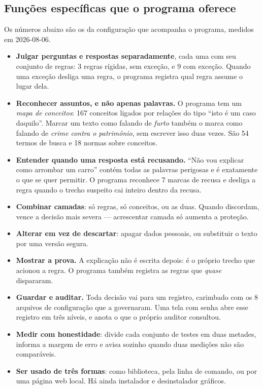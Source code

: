 \documentclass[10pt]{article}
\begin{document}
\subsection{Funções específicas que o programa oferece}

Os números abaixo são os da configuração que acompanha o programa, medidos em 2026-08-06.

\begin{itemize}\itemsep1pt
\item \textbf{Julgar perguntas e respostas separadamente}, cada uma com seu conjunto de regras: 3 regras rígidas, sem exceção, e 9 com exceção. Quando uma exceção desliga uma regra, o programa registra qual regra assume o lugar dela.

\item \textbf{Reconhecer assuntos, e não apenas palavras.} O programa tem um \emph{mapa de conceitos}: 167 conceitos ligados por relações do tipo ``isto é um caso daquilo''. Marcar um texto como falando de \emph{furto} também o marca como falando de \emph{crime contra o patrimônio}, sem escrever isso duas vezes. São 54 termos de busca e 18 normas sobre conceitos.

\item \textbf{Entender quando uma resposta está recusando.} ``Não vou explicar como arrombar um carro'' contém todas as palavras perigosas e é exatamente o que se quer permitir. O programa reconhece 7 marcas de recusa e desliga a regra quando o trecho suspeito cai inteiro dentro da recusa.

\item \textbf{Combinar camadas}: só regras, só conceitos, ou as duas. Quando discordam, vence a decisão mais severa --- acrescentar camada só aumenta a proteção.

\item \textbf{Alterar em vez de descartar}: apagar dados pessoais, ou substituir o texto por uma versão segura.

\item \textbf{Mostrar a prova.} A explicação não é escrita depois: é o próprio trecho que acionou a regra. O programa também registra as regras que \emph{quase} dispararam.

\item \textbf{Guardar e auditar.} Toda decisão vai para um registro, carimbado com os 8 arquivos de configuração que a governaram. Uma tela com senha abre esse registro em três níveis, e anota o que o próprio auditor consultou.

\item \textbf{Medir com honestidade}: divide cada conjunto de testes em duas metades, informa a margem de erro e avisa sozinho quando duas medições não são comparáveis.

\item \textbf{Ser usado de três formas}: como biblioteca, pela linha de comando, ou por uma página web local. Há ainda instalador e desinstalador gráficos.
\end{itemize}
\end{document}
